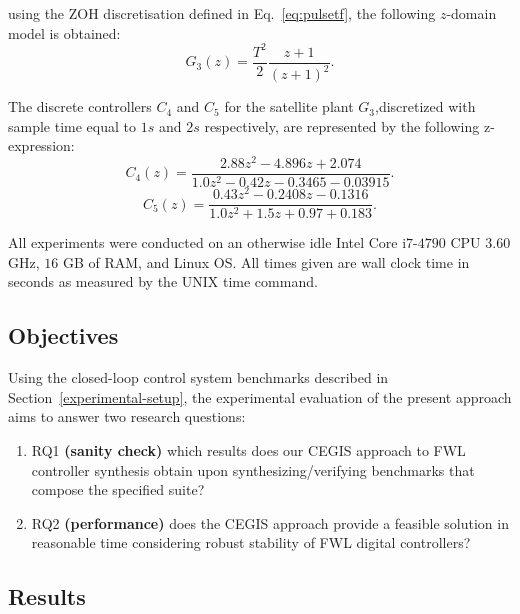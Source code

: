 \documentclass{sig-alternate-05-2015}
\begin{document}
\noindent using the ZOH discretisation defined in Eq.~\eqref{eq:pulsetf}, 
the following $z$-domain model is obtained:
\begin{equation}
G_{3}(z)= \frac{T^{2}}{2} \frac{z+1}{(z+1)^{2}}.
\end{equation}

The discrete controllers $C_{4}$ and $C_{5}$ for the satellite plant $G_{3}$,discretized with sample time equal to $1 s$ and $2 s$ respectively, 
are represented by the following z-expression:
%
\begin{equation}
\label{satellite-b2}
C_{4}(z)=\frac{2.88z^2 - 4.896z + 2.074}{1.0z^2 - 0.42z - 0.3465 - 0.03915}. \nonumber
\end{equation} 
%
\begin{equation}
\label{satellite-c2}
C_{5}(z)=\frac{0.43z^2 - 0.2408z - 0.1316}{1.0z^2 + 1.5z + 0.97 + 0.183}. \nonumber
\end{equation} 

All experiments were conducted on an otherwise idle Intel Core i$7$-$4790$ 
CPU $3$.$60$ GHz, $16$ GB of RAM, and Linux OS.  All times given are wall 
clock time in seconds as measured by the UNIX time command.

\subsection{Objectives}
\label{experimental-objectives}

Using the closed-loop control system benchmarks described in Section~\ref{experimental-setup}, 
the experimental evaluation of the present approach aims to answer two research questions:
%
\begin{enumerate}
	\item RQ1 \textbf{(sanity check)} which results does our CEGIS approach to FWL controller synthesis 
	obtain upon synthesizing/verifying benchmarks that compose the specified suite?
  \item RQ2 \textbf{(performance)} does the CEGIS approach provide a feasible solution in reasonable time
	considering robust stability of FWL digital controllers?	
\end{enumerate}

\subsection{Results}
\label{experimental-results}
\end{document}

